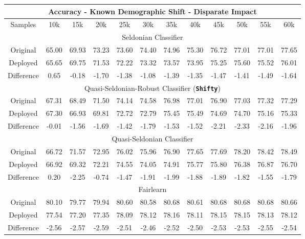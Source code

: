 \begin{table}[ht]
\footnotesize
\begin{tabular}{|c|ccccccccccc|}
\hline 
\multicolumn{12}{|c|}{Accuracy - Known Demographic Shift - Disparate Impact} \\ \hline \hline

Samples & 10k & 15k & 20k & 25k & 30k & 35k & 40k & 45k & 50k & 55k & 60k \\ \hline

\multicolumn{12}{|c|}{Seldonian Classifier} \\ \hline
Original & 65.00 & 69.93 & 73.23 & 73.60 & 74.40 & 74.96 & 75.30 & 76.72 & 77.01 & 77.01 & 77.65 \\ \hline
Deployed & 65.65 & 69.75 & 71.53 & 72.22 & 73.32 & 73.57 & 73.95 & 75.25 & 75.60 & 75.52 & 76.01 \\ \hline
Difference & 0.65 & -0.18 & -1.70 & -1.38 & -1.08 & -1.39 & -1.35 & -1.47 & -1.41 & -1.49 & -1.64 \\ \hline
  
\multicolumn{12}{|c|}{Quasi-Seldonian-Robust Classifier (\textbf{\texttt{Shifty}})} \\ \hline
Original & 67.31 & 68.49 & 71.50 & 74.14 & 74.58 & 76.98 & 77.01 & 76.90 & 77.03 & 77.32 & 77.29 \\ \hline
Deployed & 67.30 & 66.93 & 69.81 & 72.72 & 72.79 & 75.45 & 75.49 & 74.69 & 74.70 & 75.16 & 75.33 \\ \hline
Difference & -0.01 & -1.56 & -1.69 & -1.42 & -1.79 & -1.53 & -1.52 & -2.21 & -2.33 & -2.16 & -1.96 \\ \hline

\multicolumn{12}{|c|}{Quasi-Seldonian Classifier} \\ \hline
Original & 66.72 & 71.57 & 72.95 & 76.02 & 75.96 & 76.90 & 77.65 & 77.69 & 78.20 & 78.42 & 78.49 \\ \hline
Deployed & 66.92 & 69.32 & 72.21 & 74.55 & 74.05 & 74.91 & 75.77 & 75.80 & 76.38 & 76.87 & 76.70 \\ \hline
Difference & 0.20 & -2.25 & -0.74 & -1.47 & -1.91 & -1.99 & -1.88 & -1.89 & -1.82 & -1.55 & -1.79 \\ \hline

\multicolumn{12}{|c|}{Fairlearn} \\ \hline
Original & 80.10 & 79.77 & 79.94 & 80.60 & 80.58 & 80.68 & 80.61 & 80.68 & 80.68 & 80.68 & 80.66 \\ \hline
Deployed & 77.54 & 77.20 & 77.35 & 78.09 & 78.12 & 78.16 & 78.11 & 78.15 & 78.15 & 78.13 & 78.12 \\ \hline
Difference & -2.56 & -2.57 & -2.59 & -2.51 & -2.46 & -2.52 & -2.50 & -2.53 & -2.53 & -2.55 & -2.54 \\ \hline


\end{tabular}
\end{table}
